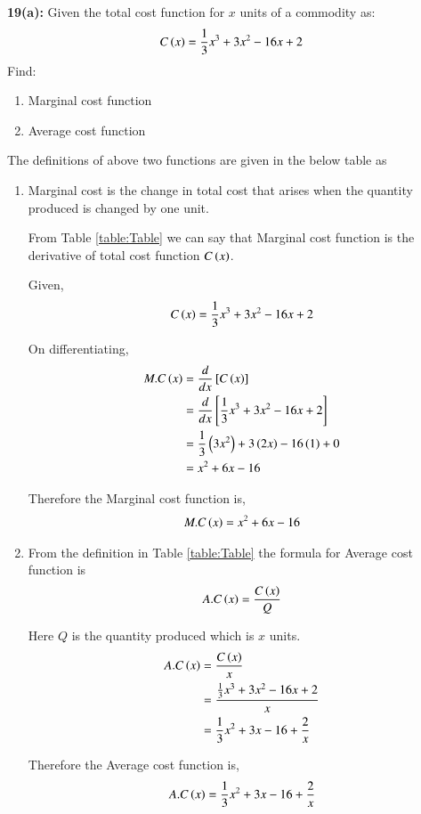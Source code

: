 \documentclass[journal,12pt,twocolumn]{IEEEtran}
\begin{document}
\textbf{19(a):} 
   Given the total cost function for $x$ units of a commodity as:
\begin{align*}
  C\left(x\right) = \frac{1}{3}x^3 + 3x^2 - 16x +2
\end{align*}
   Find:
\begin{enumerate}[ label=(\roman*)]
\item Marginal cost function
\item Average cost function
\end{enumerate}

\solution 
The definitions of above two functions are given in the below table as
\begin{table}[!htb]
\centering

\caption{}
\label{table:Table}
\end{table} 

\begin{enumerate}[ label=(\roman*)]
\item Marginal cost is the change in total cost that arises when the quantity produced is changed by one unit.

From Table
\eqref{table:Table}
we can say that Marginal cost function is the derivative of total cost function $C\left(x\right)$. 
          
Given,
\begin{align}
  C\left(x\right) = \frac{1}{3}x^3 + 3x^2 - 16x +2
\end{align}
          
On differentiating,
\begin{align}
  M.C\left(x\right) &= \frac{d}{dx} {}\left[C\left(x\right)\right]\\
              &= \frac{d}{dx} {}\left[\frac{1}{3}x^3 + 3x^2 - 16x +2\right] \\
              &= \frac{1}{3}\left(3x^2\right) + 3\left(2x\right)-16\left(1\right)+0 \\
              &= x^2+6x-16
\end{align}  
          
Therefore the Marginal cost function is,
\begin{align*}
  M.C\left(x\right)=x^2+6x-16
\end{align*}        
      
\item From the definition in Table
\eqref{table:Table}
the formula for Average cost function is
\begin{align}
  A.C\left(x\right)=\frac{C\left(x\right)}{Q}
\end{align}
         
Here $Q$ is the quantity produced which is $x$ units.
\begin{align}
  A.C\left(x\right) &=\frac{C\left(x\right)}{x} \\
              &=\frac{\frac{1}{3}x^3 + 3x^2 - 16x +2}{x} \\
              &=\frac{1}{3}x^2 + 3x - 16 +\frac{2}{x}
\end{align}    
                  
Therefore the Average cost function is,
\begin{align*}
  A.C\left(x\right)=\frac{1}{3}x^2 + 3x - 16 +\frac{2}{x}
\end{align*}
         
\end{enumerate}
  
\end{document}
